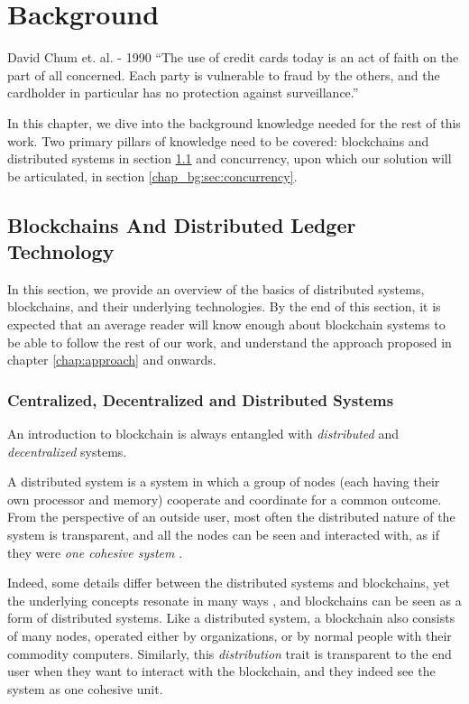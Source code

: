 \chapter{Background} \label{chap:background}

\begin{chapquote}{David Chum et. al. - 1990}
``The use of credit cards today is an act of faith on the part of all concerned. Each party is
vulnerable to fraud by the others, and the cardholder in particular has no protection against
surveillance.''
\end{chapquote}


In this chapter, we dive into the background knowledge needed for the rest of this work. Two primary
pillars of knowledge need to be covered: blockchains and distributed systems in section
\ref{chap_bg:sec:blockchains} and concurrency, upon which our solution will be articulated, in
section \ref{chap_bg:sec:concurrency}.

\section{Blockchains And Distributed Ledger Technology} \label{chap_bg:sec:blockchains}

In this section, we provide an overview of the basics of distributed systems, blockchains, and
their underlying technologies. By the end of this section, it is expected that an average reader
will know enough about blockchain systems to be able to follow the rest of our work, and understand the approach proposed in chapter \ref{chap:approach} and onwards.

\subsection{Centralized, Decentralized and Distributed Systems} \label{chap_bg_:subsec:network}

An introduction to blockchain is always entangled with \textit{distributed} and
\textit{decentralized} systems.

A distributed system is a system in which a group of nodes (each having their own processor and
memory) cooperate and coordinate for a common outcome. From the perspective of an outside user, most
often the distributed nature of the system is transparent, and all the nodes can be seen and interacted with, as if they were
\textit{one cohesive system} \cite{bashirMASTERINGBLOCKCHAINDistributed2018}.

Indeed, some details differ between the distributed systems and blockchains, yet the underlying concepts resonate in many ways
\cite{herlihyBlockchainsDistributedComputing2019}, and blockchains can be seen as a form of
distributed systems. Like a distributed system, a blockchain also consists of many nodes,
operated either by organizations, or by normal people with their commodity computers. Similarly,
this \textit{distribution} trait is transparent to the end user when they want to interact with the
blockchain, and they indeed see the system as one cohesive unit.

